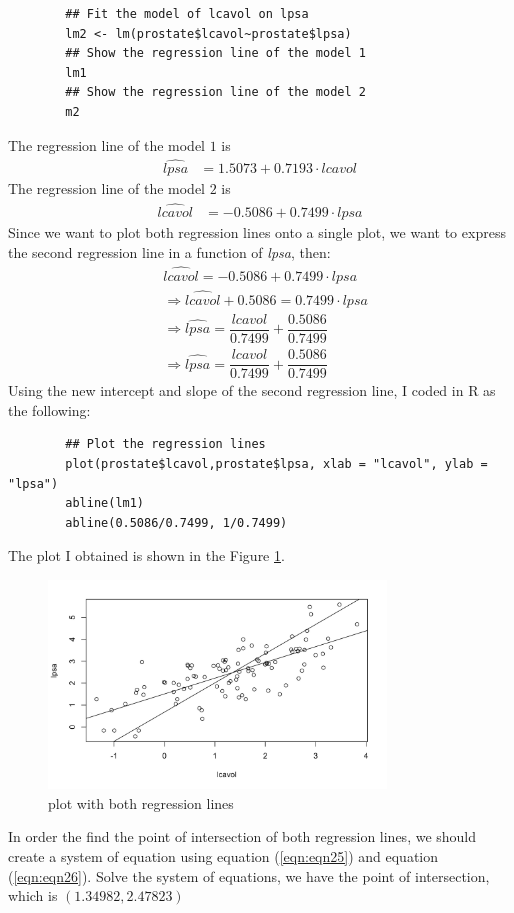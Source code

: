 \begin{answer}
\begin{verbatim}
        ## Fit the model of lcavol on lpsa
        lm2 <- lm(prostate$lcavol~prostate$lpsa)
        ## Show the regression line of the model 1
        lm1
        ## Show the regression line of the model 2
        m2
    \end{verbatim}
    The regression line of the model $1$ is 
        \begin{align}
            \widehat{lpsa} & = 1.5073 + 0.7193\cdot lcavol \label{eqn:eqn25}
        \end{align}
    The regression line of the model $2$ is 
        \begin{align}
            \widehat{lcavol} & = -0.5086 + 0.7499\cdot lpsa \label{eqn:eqn26}
        \end{align}
    Since we want to plot both regression lines onto a single plot, we want to express the second regression line in a function of \textit{lpsa}, then:    
        \begin{align}
            &\widehat{lcavol} = -0.5086 + 0.7499\cdot lpsa\\
            &\Rightarrow \widehat{lcavol} + 0.5086 = 0.7499\cdot lpsa\\
            &\Rightarrow \widehat{lpsa} = \dfrac{lcavol}{0.7499} + \dfrac{0.5086}{0.7499}\\
            &\Rightarrow \widehat{lpsa} = \dfrac{lcavol}{0.7499} + \dfrac{0.5086}{0.7499}
        \end{align}
    Using the new intercept and slope of the second regression line, I coded in R as the following:
    \begin{verbatim}
        ## Plot the regression lines
        plot(prostate$lcavol,prostate$lpsa, xlab = "lcavol", ylab = "lpsa")
        abline(lm1) 
        abline(0.5086/0.7499, 1/0.7499)
    \end{verbatim}
    The plot I obtained is shown in the Figure \ref{fig:fig2}.
    \begin{figure}[H]
        \centering
        \includegraphics[width=0.8\textwidth]{Figure 2.png}
        \caption{\label{fig:fig2}plot with both regression lines}
    \end{figure}
    In order the find the point of intersection of both regression lines, we should create a system of equation using equation (\ref{eqn:eqn25}) and equation (\ref{eqn:eqn26}). Solve the system of equations, we have the point of intersection, which is $(1.34982,2.47823)$
\end{answer}